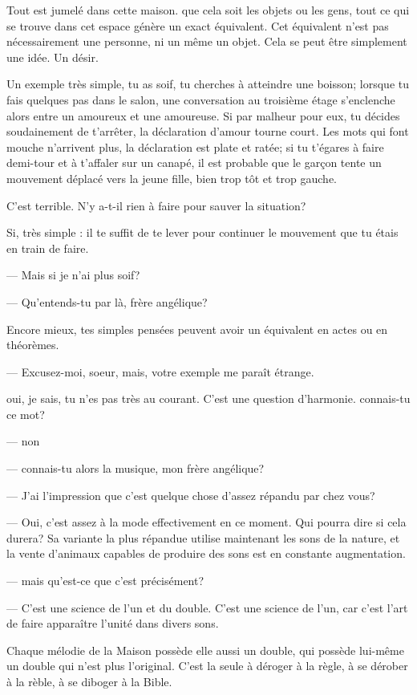 

Tout est jumelé dans cette maison. que cela soit les objets ou les
gens, tout ce qui se trouve dans cet espace génère un exact
équivalent. Cet équivalent n'est pas nécessairement une personne, ni
un même un objet. Cela se peut être simplement une idée. Un désir.

Un exemple très simple, tu as soif, tu cherches à atteindre une
boisson; lorsque tu fais quelques pas dans le salon, une conversation
au troisième étage s'enclenche alors entre un amoureux et une
amoureuse. Si par malheur pour eux, tu décides soudainement de
t'arrêter, la déclaration d'amour tourne court. Les mots qui font
mouche n'arrivent plus, la déclaration est plate et ratée; si tu
t'égares à faire demi-tour et à t'affaler sur un canapé, il est
probable que le garçon tente un mouvement déplacé vers la jeune fille,
bien trop tôt et trop gauche.

C'est terrible. N'y a-t-il rien à faire pour sauver la situation?

Si, très simple : il te suffit de te lever pour continuer
le mouvement que tu étais en train de faire.

--- Mais si je n'ai plus soif?

--- Qu'entends-tu par là, frère angélique?

Encore mieux, tes simples pensées peuvent avoir un équivalent en actes
ou en théorèmes.


--- Excusez-moi, soeur, mais, votre exemple me paraît étrange.



oui, je sais, tu n'es pas très au courant. C'est une question
d'harmonie. connais-tu ce mot?

--- non

--- connais-tu alors la musique, mon frère angélique?

--- J'ai l'impression que c'est quelque chose d'assez répandu par chez
vous?

--- Oui, c'est assez à la mode effectivement en ce moment. Qui pourra
dire si cela durera? Sa variante la plus répandue utilise maintenant
les sons de la nature, et la vente d'animaux capables de produire des
sons est en constante augmentation.

--- mais qu'est-ce que c'est précisément?

--- C'est une science de l'un et du double. C'est une science de l'un, car c'est l'art de faire apparaître l'unité
dans divers sons.

Chaque mélodie de la Maison possède elle aussi un double, qui possède
lui-même un double qui n'est plus l'original. C'est la seule à déroger
à la règle, à se dérober à la rèble, à se diboger à la Bible.

